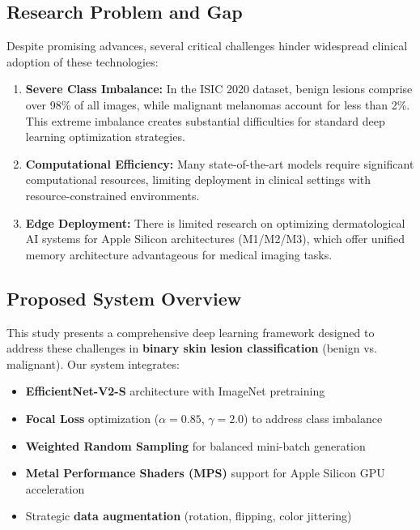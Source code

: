 \documentclass[12pt,a4paper]{article}
\begin{document}
\subsection{Research Problem and Gap}

Despite promising advances, several critical challenges hinder widespread clinical adoption of these technologies:

\begin{enumerate}
    \item \textbf{Severe Class Imbalance:} In the ISIC 2020 dataset, benign lesions comprise over 98\% of all images, while malignant melanomas account for less than 2\%. This extreme imbalance creates substantial difficulties for standard deep learning optimization strategies.
    
    \item \textbf{Computational Efficiency:} Many state-of-the-art models require significant computational resources, limiting deployment in clinical settings with resource-constrained environments.
    
    \item \textbf{Edge Deployment:} There is limited research on optimizing dermatological AI systems for Apple Silicon architectures (M1/M2/M3), which offer unified memory architecture advantageous for medical imaging tasks.
\end{enumerate}

\subsection{Proposed System Overview}

This study presents a comprehensive deep learning framework designed to address these challenges in \textbf{binary skin lesion classification} (benign vs. malignant). Our system integrates:

\begin{itemize}
    \item \textbf{EfficientNet-V2-S} architecture with ImageNet pretraining
    \item \textbf{Focal Loss} optimization ($\alpha=0.85$, $\gamma=2.0$) to address class imbalance
    \item \textbf{Weighted Random Sampling} for balanced mini-batch generation
    \item \textbf{Metal Performance Shaders (MPS)} support for Apple Silicon GPU acceleration
    \item Strategic \textbf{data augmentation} (rotation, flipping, color jittering)
\end{itemize}
\end{document}
